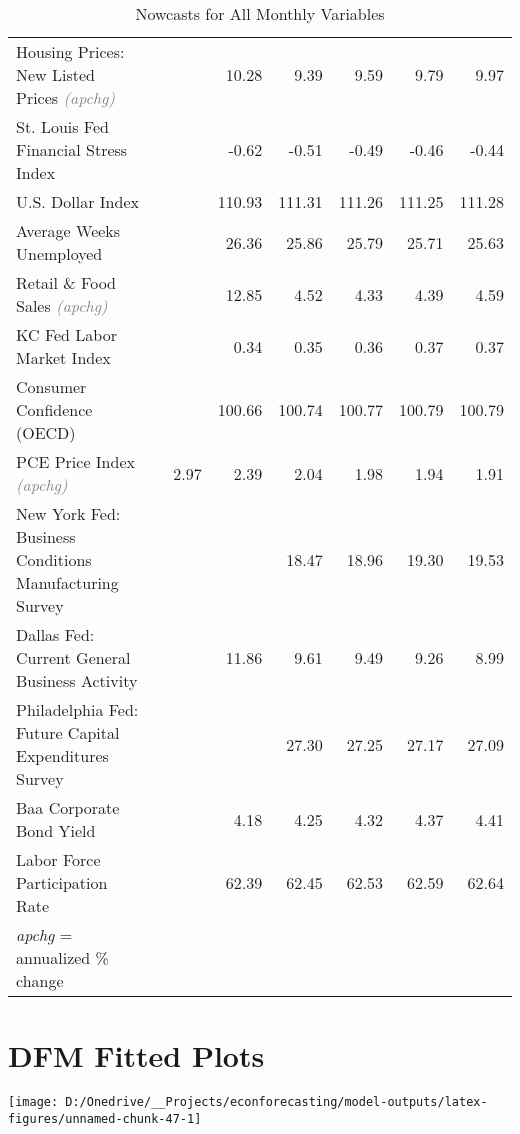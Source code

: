 \documentclass[11pt, letterpaper]{article}\usepackage[]{graphicx}\usepackage[]{color}
\begin{document}
\begin{table}[H]
\begin{tabular}{lrrrrrrr}
  Housing Prices: New Listed Prices \textit{\footnotesize\textcolor{gray}{(apchg)}} &  &  & 10.28 & 9.39 & 9.59 & 9.79 & 9.97 \\ 
  St. Louis Fed Financial Stress Index &  &  & -0.62 & -0.51 & -0.49 & -0.46 & -0.44 \\ 
  U.S. Dollar Index &  &  & 110.93 & 111.31 & 111.26 & 111.25 & 111.28 \\ 
  Average Weeks Unemployed &  &  & 26.36 & 25.86 & 25.79 & 25.71 & 25.63 \\ 
  Retail \& Food Sales \textit{\footnotesize\textcolor{gray}{(apchg)}} &  &  & 12.85 & 4.52 & 4.33 & 4.39 & 4.59 \\ 
  KC Fed Labor Market Index &  &  & 0.34 & 0.35 & 0.36 & 0.37 & 0.37 \\ 
  Consumer Confidence (OECD) &  &  & 100.66 & 100.74 & 100.77 & 100.79 & 100.79 \\ 
  PCE Price Index \textit{\footnotesize\textcolor{gray}{(apchg)}} &  & 2.97 & 2.39 & 2.04 & 1.98 & 1.94 & 1.91 \\ 
  New York Fed: Business Conditions Manufacturing Survey &  &  &  & 18.47 & 18.96 & 19.30 & 19.53 \\ 
  Dallas Fed: Current General Business Activity &  &  & 11.86 & 9.61 & 9.49 & 9.26 & 8.99 \\ 
  Philadelphia Fed: Future Capital Expenditures Survey &  &  &  & 27.30 & 27.25 & 27.17 & 27.09 \\ 
  Baa Corporate Bond Yield &  &  & 4.18 & 4.25 & 4.32 & 4.37 & 4.41 \\ 
  Labor Force Participation Rate &  &  & 62.39 & 62.45 & 62.53 & 62.59 & 62.64 \\ 
   \hline 
 \textit{apchg} = annualized \% change 
\end{tabular}
\endgroup
\caption{Nowcasts for All Monthly Variables} 
\end{table}



\appendix
\appendixpage
\addappheadtotoc

\section{DFM Fitted Plots}


{\centering \texttt{[image: D:/Onedrive/\_\_Projects/econforecasting/model-outputs/latex-figures/unnamed-chunk-47-1]} 

}
\end{document}
